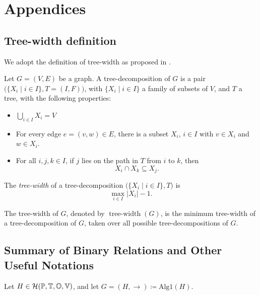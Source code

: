 \documentclass[12pt]{article}
\begin{document}
\newpage

\section{Appendices}\label{sec:appendix}

\subsection{Tree-width definition}
We adopt the definition of tree-width as proposed in \cite{ClassOfGraphsBoundedTreewidth}.


Let $G = (V, E)$ be a graph. A tree-decomposition of $G$ is a pair 
$\bigl(\{X_i \mid i \in I\}, T = (I, F)\bigr)$, with 
$\{X_i \mid i \in I\}$ a family of subsets of $V$, and $T$ a tree, with the following properties:
\begin{itemize}
    \item $\bigcup_{i \in I} X_i = V$
    \item For every edge $e = (v, w) \in E$, there is a subset $X_i$, $i \in I$ with $v \in X_i$ and $w \in X_i$.
    \item For all $i, j, k \in I$, if $j$ lies on the path in $T$ from $i$ to $k$, then 
    \[
        X_i \cap X_k \subseteq X_j.
    \]
\end{itemize}

The \emph{tree-width} of a tree-decomposition $\bigl(\{X_i \mid i \in I\}, T\bigr)$ is 
\[
    \max_{i \in I} |X_i| - 1.
\]

The tree-width of $G$, denoted by $\operatorname{tree\text{-}width}(G)$, is the minimum tree-width 
of a tree-decomposition of $G$, taken over all possible tree-decompositions of $G$.


\subsection{Summary of Binary Relations and Other Useful Notations}\label{apen:notation}

\contexthistory 
 Let $H\in\mathcal{H}(\mathbb{P}, \mathbb{T}, \mathbb{O}, \mathbb{V})$, and let $G=(H,\rightarrow)\coloneq\text{Alg1}(H)$.
 
\vspace{1em}
\renewcommand{\arraystretch}{1.6} %
\end{document}
